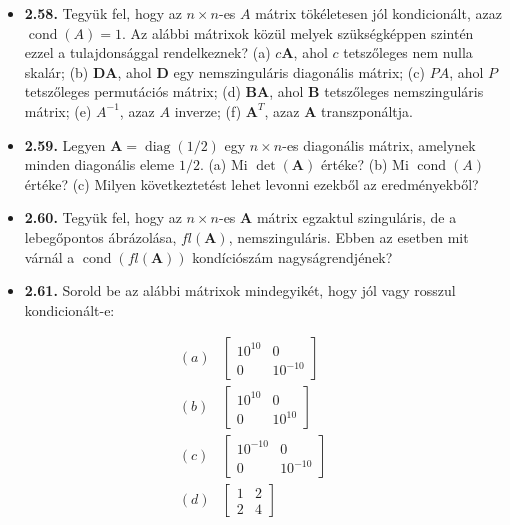 \documentclass[
  magyar,
  11pt]{article}
\providecommand{\tightlist}{%
  \setlength{\itemsep}{0pt}\setlength{\parskip}{0pt}}
\providecommand{\boldsymbol}[1]{\mathbf{#1}}
\begin{document}
\begin{itemize}
\tightlist
\item
  \textbf{2.58.} Tegyük fel, hogy az \(n \times n\)-es \(A\) mátrix
  tökéletesen jól kondicionált, azaz \(\operatorname{cond}(A) = 1\). Az
  alábbi mátrixok közül melyek szükségképpen szintén ezzel a
  tulajdonsággal rendelkeznek? (a) \(c\boldsymbol{A}\), ahol \(c\)
  tetszőleges nem nulla skalár; (b) \(\boldsymbol{D}\boldsymbol{A}\),
  ahol \(\boldsymbol{D}\) egy nemszinguláris diagonális mátrix; (c)
  \(PA\), ahol \(P\) tetszőleges permutációs mátrix; (d)
  \(\boldsymbol{B}\boldsymbol{A}\), ahol \(\boldsymbol{B}\) tetszőleges
  nemszinguláris mátrix; (e) \(A^{-1}\), azaz \(A\) inverze; (f)
  \(\boldsymbol{A}^T\), azaz \(\boldsymbol{A}\) transzponáltja.
\item
  \textbf{2.59.} Legyen \(\boldsymbol{A} = \operatorname{diag}(1/2)\)
  egy \(n \times n\)-es diagonális mátrix, amelynek minden diagonális
  eleme \(1/2\). (a) Mi \(\det(\boldsymbol{A})\) értéke? (b) Mi
  \(\operatorname{cond}(A)\) értéke? (c) Milyen következtetést lehet
  levonni ezekből az eredményekből?
\item
  \textbf{2.60.} Tegyük fel, hogy az \(n \times n\)-es
  \(\boldsymbol{A}\) mátrix egzaktul szinguláris, de a lebegőpontos
  ábrázolása, \(fl(\boldsymbol{A})\), nemszinguláris. Ebben az esetben
  mit várnál a \(\operatorname{cond}(fl(\boldsymbol{A}))\) kondíciószám
  nagyságrendjének?
\item
  \textbf{2.61.} Sorold be az alábbi mátrixok mindegyikét, hogy jól vagy
  rosszul kondicionált-e:
\end{itemize}

\[\begin{array}{lll}
(a) & \begin{bmatrix} 10^{10} & 0 \\ 0 & 10^{-10} \end{bmatrix} \\
(b) & \begin{bmatrix} 10^{10} & 0 \\ 0 & 10^{10} \end{bmatrix} \\
(c) & \begin{bmatrix} 10^{-10} & 0 \\ 0 & 10^{-10} \end{bmatrix} \\
(d) & \begin{bmatrix} 1 & 2 \\ 2 & 4 \end{bmatrix}
\end{array}\]
\end{document}
